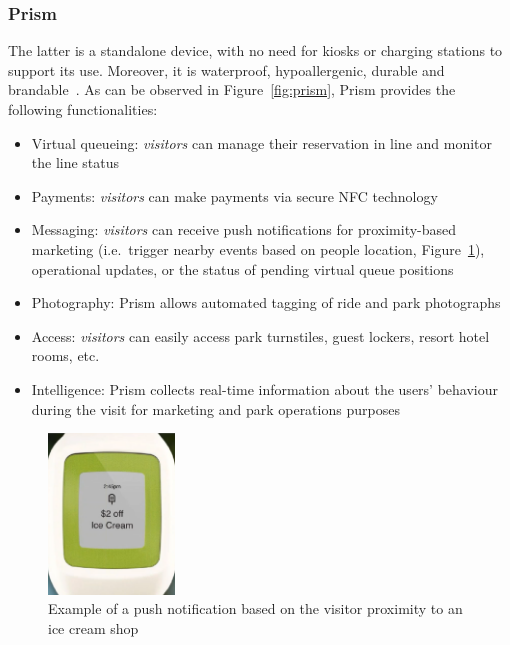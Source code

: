 \subsubsection*{Prism}
The latter is a standalone device, with no need for kiosks or charging stations to support its use.
Moreover, it is waterproof, hypoallergenic, durable and brandable~\cite{prism-desc}.
As can be observed in Figure~\ref{fig:prism}, Prism provides the following functionalities:
\begin{itemize}
    \item Virtual queueing: \textit{visitors} can manage their reservation in line and monitor the line status
    \item Payments: \textit{visitors} can make payments via secure NFC technology
    \item Messaging: \textit{visitors} can receive push notifications for proximity-based marketing (i.e.\ trigger nearby events based on people location, Figure~\ref{fig:prism-icecream}), operational updates, or the status of pending virtual queue positions
    \item Photography: Prism allows automated tagging of ride and park photographs
    \item Access: \textit{visitors} can easily access park turnstiles, guest lockers, resort hotel rooms, etc.
    \item Intelligence: Prism collects real-time information about the users' behaviour during the visit for marketing and park operations purposes
\end{itemize}

\begin{figure}[H]
    \centering
    \includegraphics[width=0.3\textwidth]{img/prism-icecream}
    \caption{Example of a push notification based on the visitor proximity to an ice cream shop}
    \label{fig:prism-icecream}
\end{figure}

